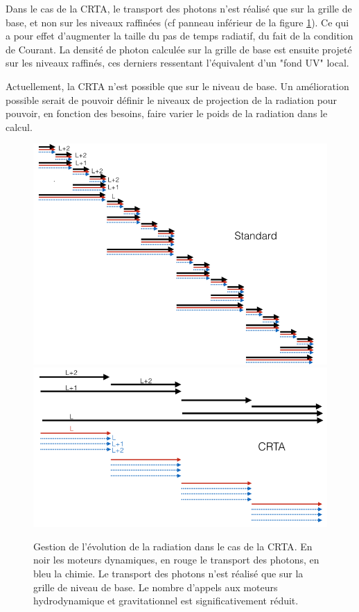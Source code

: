 Dans le cas de la \ac{CRTA}, le transport des photons n'est réalisé que sur la grille de base, et non sur les niveaux raffinées (cf panneau inférieur de la figure \ref{fig:CRTA}).
Ce qui a pour effet d'augmenter la taille du pas de temps radiatif, du fait de la condition de Courant.
La densité de photon calculée sur la grille de base est ensuite projeté sur les niveaux raffinés, ces derniers ressentant l'équivalent d'un "fond UV" local.

Actuellement, la \ac{CRTA} n'est possible que sur le niveau de base.
Un amélioration possible serait de pouvoir définir le niveaux de projection de la radiation pour pouvoir, en fonction des besoins, faire varier le poids de la radiation dans le calcul.



\begin{figure}
\includegraphics[width=.95\linewidth]{img/02/revz_crad_std.png}
\includegraphics[width=.95\linewidth]{img/02/revz_crad.png}
\caption[CRTA]{Gestion de l'évolution de la radiation dans le cas de la \ac{CRTA}.
En noir les moteurs dynamiques, en rouge le transport des photons, en bleu la chimie.
Le transport des photons n'est réalisé que sur la grille de niveau de base.
Le nombre d'appels aux moteurs hydrodynamique et gravitationnel est significativement réduit. 
\label{fig:CRTA}}
\end{figure}